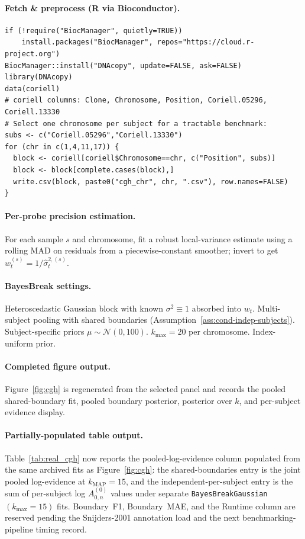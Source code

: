 \paragraph{Fetch \& preprocess (R via Bioconductor).}
\begin{verbatim}
if (!require("BiocManager", quietly=TRUE))
    install.packages("BiocManager", repos="https://cloud.r-project.org")
BiocManager::install("DNAcopy", update=FALSE, ask=FALSE)
library(DNAcopy)
data(coriell)
# coriell columns: Clone, Chromosome, Position, Coriell.05296, Coriell.13330
# Select one chromosome per subject for a tractable benchmark:
subs <- c("Coriell.05296","Coriell.13330")
for (chr in c(1,4,11,17)) {
  block <- coriell[coriell$Chromosome==chr, c("Position", subs)]
  block <- block[complete.cases(block),]
  write.csv(block, paste0("cgh_chr", chr, ".csv"), row.names=FALSE)
}
\end{verbatim}

\paragraph{Per-probe precision estimation.}
For each sample $s$ and chromosome, fit a robust local-variance estimate using a rolling MAD on
residuals from a piecewise-constant smoother; invert to get $w^{(s)}_t=1/\widehat\sigma_t^{2,(s)}$.

\paragraph{BayesBreak settings.}
Heteroscedastic Gaussian block with known $\sigma^2\equiv 1$ absorbed into $w_t$. Multi-subject
pooling with shared boundaries (Assumption~\ref{ass:cond-indep-subjects}). Subject-specific
priors $\mu\sim\mathcal{N}(0,100)$. $k_{\max}=20$ per chromosome. Index-uniform prior.

\paragraph{Completed figure output.}
Figure~\ref{fig:cgh} is regenerated from the selected panel and records the pooled shared-boundary fit, pooled boundary posterior, posterior over $k$, and per-subject evidence display.

\paragraph{Partially-populated table output.}
Table~\ref{tab:real_cgh} now reports the pooled-log-evidence column populated from the same archived fits as Figure~\ref{fig:cgh}: the shared-boundaries entry is the joint pooled log-evidence at $k_{\mathrm{MAP}}=15$, and the independent-per-subject entry is the sum of per-subject log $A^{(0)}_{0,n}$ values under separate \texttt{BayesBreakGaussian}$(k_{\max}=15)$ fits. Boundary~F1, Boundary~MAE, and the Runtime column are reserved pending the Snijders-2001 annotation load and the next benchmarking-pipeline timing record.

